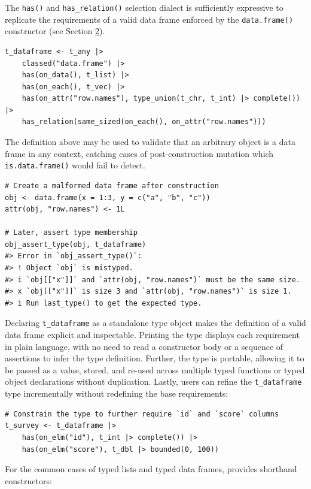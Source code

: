 The \texttt{has()} and \texttt{has\_relation()} selection dialect is sufficiently expressive to replicate the requirements of a valid data frame enforced by the \texttt{data.frame()} constructor (see Section \hyperref[sec-object-types]{2}).

\begin{verbatim}
t_dataframe <- t_any |>
    classed("data.frame") |>
    has(on_data(), t_list) |>
    has(on_each(), t_vec) |>
    has(on_attr("row.names"), type_union(t_chr, t_int) |> complete()) |>
    has_relation(same_sized(on_each(), on_attr("row.names")))
\end{verbatim}

The definition above may be used to validate that an arbitrary object is a data frame in any context, catching cases of post-construction mutation which \texttt{is.data.frame()} would fail to detect.

\begin{verbatim}
# Create a malformed data frame after construction
obj <- data.frame(x = 1:3, y = c("a", "b", "c"))
attr(obj, "row.names") <- 1L

# Later, assert type membership
obj_assert_type(obj, t_dataframe)
#> Error in `obj_assert_type()`:
#> ! Object `obj` is mistyped.
#> i `obj[["x"]]` and `attr(obj, "row.names")` must be the same size.
#> x `obj[["x"]]` is size 3 and `attr(obj, "row.names")` is size 1.
#> i Run last_type() to get the expected type.
\end{verbatim}

Declaring \texttt{t\_dataframe} as a standalone type object makes the definition of a valid data frame explicit and inspectable. Printing the type displays each requirement in plain language, with no need to read a constructor body or a sequence of assertions to infer the type definition. Further, the type is portable, allowing it to be passed as a value, stored, and re-used across multiple typed functions or typed object declarations without duplication. Lastly, users can refine the \texttt{t\_dataframe} type incrementally without redefining the base requirements:

\begin{verbatim}
# Constrain the type to further require `id` and `score` columns
t_survey <- t_dataframe |>
    has(on_elm("id"), t_int |> complete()) |>
    has(on_elm("score"), t_dbl |> bounded(0, 100))
\end{verbatim}

For the common cases of typed lists and typed data frames,  provides shorthand constructors:

